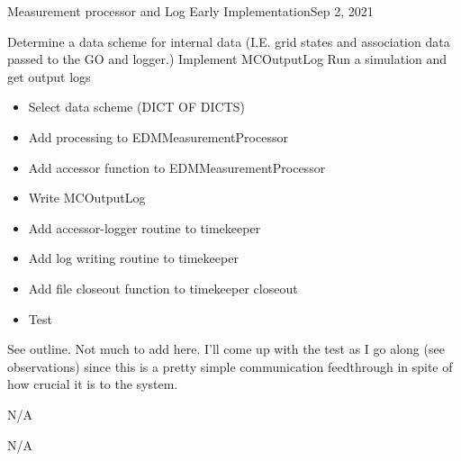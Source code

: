 \begin{entry}{Measurement processor and Log Early Implementation}{Sep 2, 2021}
    \objective 
    
    Determine a data scheme for internal data (I.E. grid states and association data passed to the GO and logger.)
    Implement MCOutputLog
    Run a simulation and get output logs

    \outline

    \begin{itemize}
        \item Select data scheme (DICT OF DICTS)
        \item Add processing to EDMMeasurementProcessor
        \item Add accessor function to EDMMeasurementProcessor
        \item Write MCOutputLog
        \item Add accessor-logger routine to timekeeper
        \item Add log writing routine to timekeeper
        \item Add file closeout function to timekeeper closeout
        \item Test

    \end{itemize}

    \procedures
    
    See outline. Not much to add here. I'll come up with the test as I go along (see observations) since this is a
    pretty simple communication feedthrough in spite of how crucial it is to the system.

    \parameters
    
    N/A

    \observations
    


    \data
    
    N/A

    \results
    


\end{entry}


